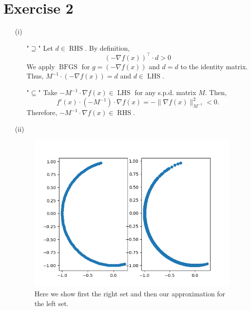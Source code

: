 \documentclass{article}
\begin{document}
\section*{Exercise 2}
\begin{enumerate}
    \item[(i)]
    \begin{itemize}
        \item["$\supseteq$"] Let $d \in \operatorname{RHS}$. By definition,
        \[
            (-\nabla f(x))^\top \cdot d > 0 
        \]
        We apply $\operatorname*{BFGS}$ for $g = (-\nabla f(x))$ and $d = d$ to the identity matrix. Thus, $M^{-1} \cdot (-\nabla f(x)) = d$ and $d \in \operatorname*{LHS}$.
        \item["$\subseteq$"] Take $-M^{-1} \cdot \nabla f(x)\in \operatorname*{LHS}$ for any s.p.d. matrix $M$. Then,
        \[
            f'(x) \cdot (-M^{-1}) \cdot \nabla f(x) = - \lVert\nabla f(x)\rVert^2_{M^{-1}} < 0.
        \]
        Therefore, \(-M^{-1} \cdot \nabla f(x) \in \operatorname{RHS}\).
    \end{itemize}
\item[(ii)] 
\begin{figure}[ht]
    \includegraphics[width=\textwidth]{2_ii_2d_plot.png}
    \caption{Here we show first the right set and then our approximation for the left set.}
\end{figure}
\end{enumerate}
\end{document}
